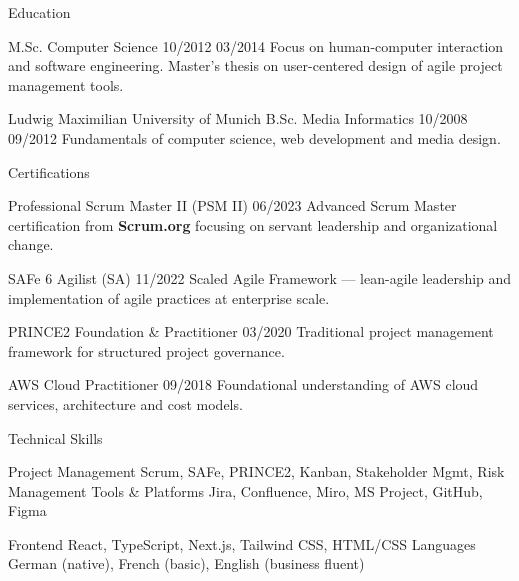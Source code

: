 \documentclass[11pt, a4paper]{article}
\begin{document}
\begin{timelinesection}{Education}

    {M.Sc. Computer Science}
    {10/2012}
    {03/2014}
    {Focus on human-computer interaction and software engineering.
    Master's thesis on user-centered design of agile project management tools.}

  \timelineitem
    {Ludwig Maximilian University of Munich}
    {B.Sc. Media Informatics}
    {10/2008}
    {09/2012}
    {Fundamentals of computer science, web development and media design.}

\end{timelinesection}

\begin{timelinesection}{Certifications}

  \timelineitem
    {Professional Scrum Master II (PSM II)}
    {}
    {}
    {06/2023}
    {Advanced Scrum Master certification from \textbf{Scrum.org} focusing
    on servant leadership and organizational change.}

  \timelineitem
    {SAFe 6 Agilist (SA)}
    {}
    {}
    {11/2022}
    {Scaled Agile Framework --- lean-agile leadership and implementation
    of agile practices at enterprise scale.}

  \timelineitem
    {PRINCE2 Foundation \& Practitioner}
    {}
    {}
    {03/2020}
    {Traditional project management framework for structured project governance.}

  \timelineitem
    {AWS Cloud Practitioner}
    {}
    {}
    {09/2018}
    {Foundational understanding of AWS cloud services, architecture and cost models.}

\end{timelinesection}

\begin{skillssection}{Technical Skills}

  \skillrow
    {}{Project Management}
    {Scrum, SAFe, PRINCE2, Kanban, Stakeholder Mgmt, Risk Management}
    {}{Tools \& Platforms}
    {Jira, Confluence, Miro, MS Project, GitHub, Figma}

  \skillrow
    {}{Frontend}
    {React, TypeScript, Next.js, Tailwind CSS, HTML/CSS}
    {}{Languages}
    {German (native), French (basic), English (business fluent)}

\end{skillssection}
\end{document}
